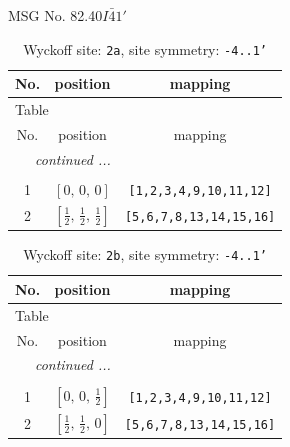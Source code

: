 \documentclass[fleqn,8pt]{jsarticle}
\begin{document}
\setcounter{MaxMatrixCols}{32}

\renewcommand{\tablename}{Table~}
\renewcommand{\figurename}{Figure~}
\begin{center}
\LARGE
MSG No. 82.40\quad$I\bar{4}1'$
\end{center}
\renewcommand{\arraystretch}{1.2}
\begin{longtable}{ccc}
\caption{Wyckoff site: {\tt 2a}, site symmetry: {\tt -4..1'}}
 \\
 \hline \hline
No. & position & mapping \\ \hline \endfirsthead

\multicolumn{2}{l}{\tablename\ \thetable{}} \\
 \hline \hline
No. & position & mapping \\ \hline \endhead

 \hline \hline
\multicolumn{2}{r}{\footnotesize\it continued ...} \\ \endfoot

 \hline \hline
\multicolumn{2}{r}{} \\ \endlastfoot

1 & $\left[ 0,\, 0,\, 0 \right]$ & {\tt [1,2,3,4,9,10,11,12]} \\ \hline
2 & $\left[ \frac{1}{2},\, \frac{1}{2},\, \frac{1}{2} \right]$ & {\tt [5,6,7,8,13,14,15,16]} \\
\end{longtable}
\renewcommand{\arraystretch}{1.2}
\begin{longtable}{ccc}
\caption{Wyckoff site: {\tt 2b}, site symmetry: {\tt -4..1'}}
 \\
 \hline \hline
No. & position & mapping \\ \hline \endfirsthead

\multicolumn{2}{l}{\tablename\ \thetable{}} \\
 \hline \hline
No. & position & mapping \\ \hline \endhead

 \hline \hline
\multicolumn{2}{r}{\footnotesize\it continued ...} \\ \endfoot

 \hline \hline
\multicolumn{2}{r}{} \\ \endlastfoot

1 & $\left[ 0,\, 0,\, \frac{1}{2} \right]$ & {\tt [1,2,3,4,9,10,11,12]} \\ \hline
2 & $\left[ \frac{1}{2},\, \frac{1}{2},\, 0 \right]$ & {\tt [5,6,7,8,13,14,15,16]} \\
\end{longtable}
\end{document}
